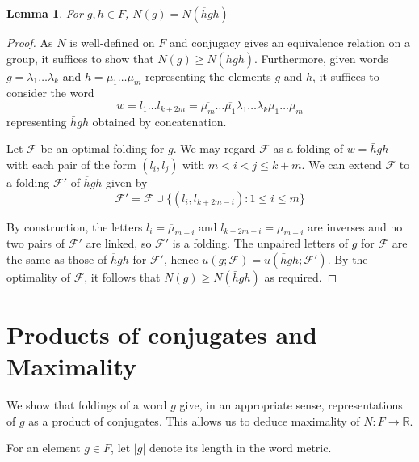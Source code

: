 \documentclass{amsart}
\theoremstyle{plain}
\newtheorem{lemma}[theorem]{Lemma}
\theoremstyle{definition}
\theoremstyle{remark}
\newcommand{\R}{\mathbb{R}}
\newcommand{\F}{\mathcal{F}}
\begin{document}
\begin{lemma}
For $g,h\in F$, $N(g)=N(\overline{h}gh)$
\end{lemma}
\begin{proof}
As $N$ is well-defined on $F$ and conjugacy gives an equivalence relation on a group, it suffices to show that $N(g)\geq N(\overline{h}gh)$. Furthermore, given words $g=\lambda_1\dots \lambda_k$ and $h=\mu_1\dots \mu_m$ representing the elements $g$ and $h$, it suffices to consider the word 
$$w=l_1\dots l_{k+2m}=\overline{\mu_m}\dots \overline{\mu_1}\lambda_1\dots \lambda_k\mu_1\dots \mu_m$$
representing $\bar{h}gh$ obtained by concatenation. 

Let $\F$ be an optimal folding for $g$. We may regard $\F$ as a folding of $w=\bar{h}gh$ with each pair of the form $(l_i,l_j)$ with $m<i<j\leq k+m$. We can extend $\F$ to a folding $\F'$ of $\overline{h}gh$ given by
$$\F'=\F\cup \{(l_i,l_{k+2m-i}):1\leq i\leq m \}$$

By construction, the letters $l_i=\overline{\mu}_{m-i}$ and $l_{k+2m-i}=\mu_{m-i}$ are inverses and no two pairs of $\F'$ are linked, so $\F'$ is a folding. The unpaired letters of $g$ for $\F$ are the same as those of $\overline{h}gh$ for $\F'$, hence $u(g;\F)=u(\bar{h}gh;\F')$. By the optimality of $\F$, it follows that $N(g)\geq N(\bar{h}gh)$ as required.
\end{proof}

\section{Products of conjugates and Maximality}

We show that foldings of a word $g$ give, in an appropriate sense, representations of $g$ as a product of conjugates. This allows us to deduce maximality of $N:F\to\R$. 

For an element $g\in F$, let $\vert g\vert$ denote its length in the word metric.
\end{document}
